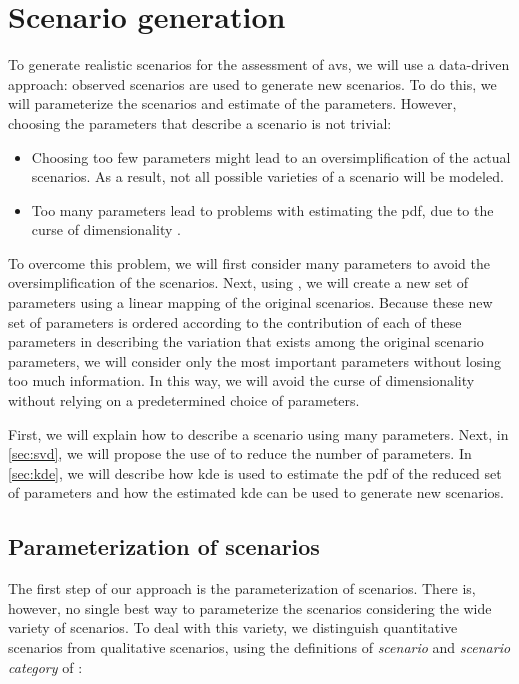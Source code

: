 \section{Scenario generation}
\label{sec:generation}

To generate realistic scenarios for the assessment of \acp{av}, we will use a data-driven approach: observed scenarios are used to generate new scenarios.
To do this, we will parameterize the scenarios and estimate  of the parameters.
However, choosing the parameters that describe a scenario is not trivial:
\begin{itemize}
	\item Choosing too few parameters might lead to an oversimplification of the actual scenarios.
	As a result, not all possible varieties of a scenario will be modeled.
	
	\item Too many parameters lead to problems with estimating the \ac{pdf}, due to the curse of dimensionality \autocite{scott1992multivariate}.
\end{itemize}
To overcome this problem, we will first consider many parameters to avoid the oversimplification of the scenarios. 
Next, using , we will create a new set of parameters using a linear mapping of the original scenarios.
Because these new set of parameters is ordered according to the contribution of each of these parameters in describing the variation that exists among the original scenario parameters, we will consider only the most important parameters without losing too much information.
In this way, we will avoid the curse of dimensionality without relying on a predetermined choice of parameters.

First, we will explain how to describe a scenario using many parameters.
Next, in \cref{sec:svd}, we will propose the use of  to reduce the number of parameters.
In \cref{sec:kde}, we will describe how \ac{kde} is used to estimate the \ac{pdf} of the reduced set of parameters and how the estimated \ac{kde} can be used to generate new scenarios.



\subsection{Parameterization of scenarios}
\label{sec:parameterization}

The first step of our approach is the parameterization of scenarios.
There is, however, no single best way to parameterize the scenarios considering the wide variety of scenarios.
To deal with this variety, we distinguish quantitative scenarios from qualitative scenarios, using the definitions of \emph{scenario} and \emph{scenario category} of \autocite{degelder2020ontology}:

